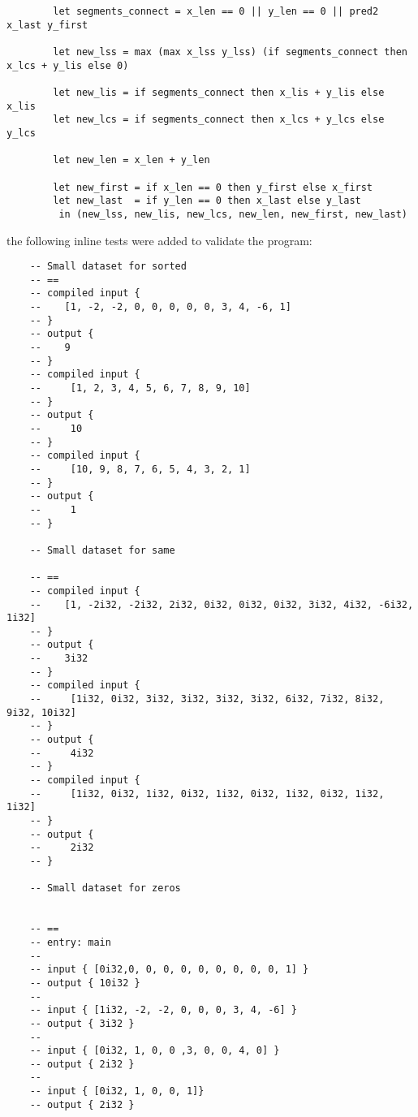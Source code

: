 \documentclass{article}
\begin{document}
\begin{itemize}
    \begin{lstlisting}
        let segments_connect = x_len == 0 || y_len == 0 || pred2 x_last y_first

        let new_lss = max (max x_lss y_lss) (if segments_connect then x_lcs + y_lis else 0)
      
        let new_lis = if segments_connect then x_lis + y_lis else x_lis
        let new_lcs = if segments_connect then x_lcs + y_lcs else y_lcs
      
        let new_len = x_len + y_len
      
        let new_first = if x_len == 0 then y_first else x_first
        let new_last  = if y_len == 0 then x_last else y_last
         in (new_lss, new_lis, new_lcs, new_len, new_first, new_last)
    \end{lstlisting}

    the following inline tests were added to validate the program:
    \begin{lstlisting}
    -- Small dataset for sorted
    -- ==
    -- compiled input {
    --    [1, -2, -2, 0, 0, 0, 0, 0, 3, 4, -6, 1]
    -- }  
    -- output { 
    --    9
    -- }
    -- compiled input {
    --     [1, 2, 3, 4, 5, 6, 7, 8, 9, 10]
    -- }
    -- output {
    --     10
    -- }
    -- compiled input {
    --     [10, 9, 8, 7, 6, 5, 4, 3, 2, 1]
    -- }
    -- output {
    --     1
    -- }

    -- Small dataset for same

    -- ==
    -- compiled input {
    --    [1, -2i32, -2i32, 2i32, 0i32, 0i32, 0i32, 3i32, 4i32, -6i32, 1i32]
    -- }
    -- output {
    --    3i32
    -- }
    -- compiled input {
    --     [1i32, 0i32, 3i32, 3i32, 3i32, 3i32, 6i32, 7i32, 8i32, 9i32, 10i32]
    -- }
    -- output {
    --     4i32
    -- }
    -- compiled input {
    --     [1i32, 0i32, 1i32, 0i32, 1i32, 0i32, 1i32, 0i32, 1i32, 1i32]
    -- }
    -- output {
    --     2i32
    -- }

    -- Small dataset for zeros


    -- ==
    -- entry: main
    -- 
    -- input { [0i32,0, 0, 0, 0, 0, 0, 0, 0, 0, 1] }
    -- output { 10i32 }
    --
    -- input { [1i32, -2, -2, 0, 0, 0, 3, 4, -6] }
    -- output { 3i32 }
    --
    -- input { [0i32, 1, 0, 0 ,3, 0, 0, 4, 0] }
    -- output { 2i32 }
    --
    -- input { [0i32, 1, 0, 0, 1]}
    -- output { 2i32 }
    \end{lstlisting}




\end{itemize}
\end{document}
